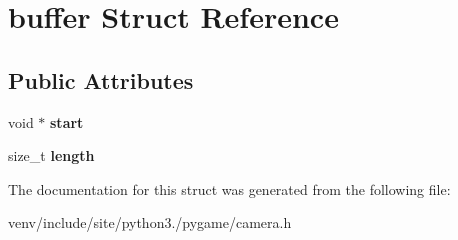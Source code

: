 \hypertarget{structbuffer}{}\section{buffer Struct Reference}
\label{structbuffer}
\subsection*{Public Attributes}
\begin{DoxyCompactItemize}
\item 
\mbox{\label{structbuffer_a8be3721dc0863d9dd7460504bbaeb0d1}} 
void $\ast$ {\bfseries start}
\item 
\mbox{\label{structbuffer_a4f467cc251f2f4504d484913c7da47bd}} 
size\+\_\+t {\bfseries length}
\end{DoxyCompactItemize}


The documentation for this struct was generated from the following file\+:\begin{DoxyCompactItemize}
\item 
venv/include/site/python3./pygame/camera.\+h\end{DoxyCompactItemize}
